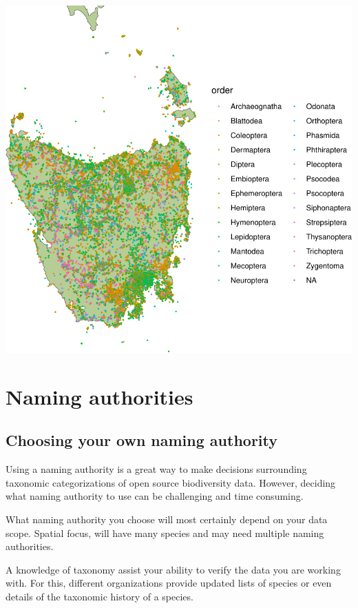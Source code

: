 \documentclass[
  letterpaper,
  DIV=11,
  numbers=noendperiod,
  oneside]{scrreprt}
\begin{document}
\includegraphics{./scope_files/figure-pdf/unnamed-chunk-2-1.pdf}

\hypertarget{naming-authorities}{%
\section{Naming authorities}\label{naming-authorities}}

\hypertarget{choosing-your-own-naming-authority}{%
\subsection{Choosing your own naming
authority}\label{choosing-your-own-naming-authority}}

Using a naming authority is a great way to make decisions surrounding
taxonomic categorizations of open source biodiversity data. However,
deciding what naming authority to use can be challenging and time
consuming.

What naming authority you choose will most certainly depend on your data
scope. Spatial focus, will have many species and may need multiple
naming authorities.

A knowledge of taxonomy assist your ability to verify the data you are
working with. For this, different organizations provide updated lists of
species or even details of the taxonomic history of a species.
\end{document}
